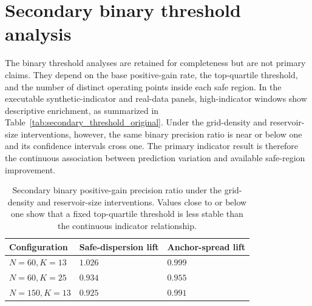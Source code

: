 \documentclass[11pt,a4paper]{article}
\begin{document}
\section{Secondary binary threshold analysis}
\label{app:binary_threshold}

The binary threshold analyses are retained for completeness but are not primary claims. They depend on the base positive-gain rate, the top-quartile threshold, and the number of distinct operating points inside each safe region. In the executable synthetic-indicator and real-data panels, high-indicator windows show descriptive enrichment, as summarized in Table~\ref{tab:secondary_threshold_original}. Under the grid-density and reservoir-size interventions, however, the same binary precision ratio is near or below one and its confidence intervals cross one. The primary indicator result is therefore the continuous association between prediction variation and available safe-region improvement.

\begin{table}[h]
\centering
\caption{Secondary top-quartile threshold analysis for the executable synthetic-indicator and real-data panels. Each cell reports the range across safe-region dispersion and low/high endpoint spread. These values are descriptive for the corresponding study settings.}
\label{tab:secondary_threshold_original}
\end{table}

\begin{table}[h]
\centering
\caption{Secondary binary positive-gain precision ratio under the grid-density and reservoir-size interventions. Values close to or below one show that a fixed top-quartile threshold is less stable than the continuous indicator relationship.}
\label{tab:secondary_threshold_robustness}
\begin{tabular}{lll}
\toprule
Configuration & Safe-dispersion lift & Anchor-spread lift \\
\midrule
$N=60,K=13$ & $1.026$ & $0.999$ \\
$N=60,K=25$ & $0.934$ & $0.955$ \\
$N=150,K=13$ & $0.925$ & $0.991$ \\
\bottomrule
\end{tabular}
\end{table}
\end{document}
